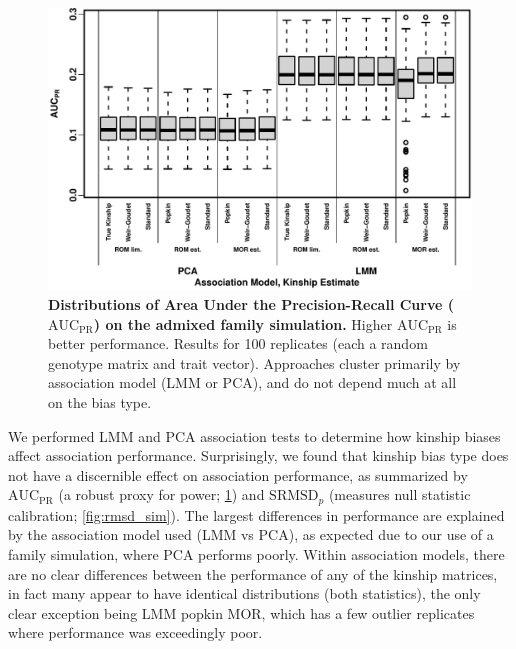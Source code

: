 \documentclass[11pt]{article}
\newcommand{\rmsd}{\text{SRMSD}_p}
\newcommand{\auc}{\text{AUC}_\text{PR}}
\begin{document}
\begin{figure}[bp!]
  \centering
  \includegraphics[width=\textwidth]{sim-admix-n1000-m100000-k3-f0.3-s0.5-mc100-h0.8-g20-fes/auc.pdf}
  \caption{
    {\bf Distributions of Area Under the Precision-Recall Curve ($\auc$) on the admixed family simulation.}
    Higher $\auc$ is better performance.
    Results for 100 replicates (each a random genotype matrix and trait vector).
    Approaches cluster primarily by association model (LMM or PCA), and do not depend much at all on the bias type.
  }
  \label{fig:auc_sim}
\end{figure}

We performed LMM and PCA association tests to determine how kinship biases affect association performance.
Surprisingly, we found that kinship bias type does not have a discernible effect on association performance, as summarized by $\auc$ (a robust proxy for power; \cref{fig:auc_sim}) and $\rmsd$ (measures null statistic calibration; \cref{fig:rmsd_sim}).
The largest differences in performance are explained by the association model used (LMM vs PCA), as expected due to our use of a family simulation, where PCA performs poorly.
Within association models, there are no clear differences between the performance of any of the kinship matrices, in fact many appear to have identical distributions (both statistics), the only clear exception being LMM popkin MOR, which has a few outlier replicates where performance was exceedingly poor.
\end{document}
